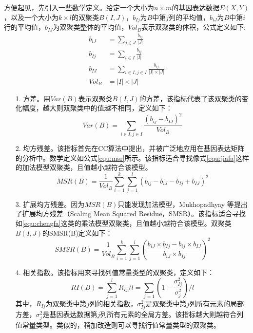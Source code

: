   方便起见，先引入一些数学定义。给定一个大小为$n\times m$的基因表达数据$E(X,Y)$，以及一个大小为$k\times l$的双聚类$B(I,J)$，$b_{Ij}$为$B$中第$j$列的平均值，$b_{iJ}$为$B$中第$i$行的平均值，$b_{IJ}$为双聚类整体的平均值，$Vol_B$表示双聚类的体积，公式定义如下:
  \begin{align}
    b_{iJ} &= \sum_{j\in J}\frac{b_{ij}}{|J|} \\
    b_{Ij} &= \sum_{i\in I}\frac{b_{ij}}{|I|} \\
    b_{IJ} &= \sum_{i\in I,j\in I}\frac{ b_{ij} }{|I| \times |J|}\\
    Vol_B &= |I| \times |J|
  \end{align}
  \begin{enumerate}
    \item[1.] 方差。用$Var(B)$表示双聚类$B(I,J)$的方差，该指标代表了该双聚类的变化幅度，越大则双聚类中的值越不相同，定义如下：
    \begin{equation}
      Var(B) = \sum_{i\in I,j\in I}\frac{(b_{ij}-b_{IJ})^2}{Vol_B}
    \end{equation}

    \item[2.] 均方残差。该指标首先在CC算法中提出，并被广泛地应用在基因表达矩阵的分析中。数学定义如公式\ref{equ:msr}所示。该指标适合寻找像式\ref{equ:jiafa}这样的加法模型双聚类，且值越小越符合该模型。
    \begin{equation}\label{equ:msr}
      MSR(B) = \frac{1}{Vol_B}\sum_{i=1}^k\sum_{j=1}^l(b_{ij}-b_{iJ}-b_{Ij}+b_{IJ})^2
    \end{equation}

    \item[3.] 扩展均方残差。因为$MSR(B)$只能发现加法模型，Mukhopadhyay 等提出了扩展均方残差（Scaling Mean Squared Residue，SMSR）。该指标适合寻找如\ref{equ:chengfa}这类的乘法模型双聚类，且值越小越符合该模型。双聚类$B(I,J)$的SMSR(B)定义如下：
    \begin{equation}\label{equ:smsr}
      SMSR(B) = \frac{1}{Vol_B}\sum_{i=1}^k\sum_{j=1}^l(\frac{b_{iJ}\times b_{Ij}-b_{ij}\times b_{IJ}}{b_{iJ}\times b_{Ij}})^2
    \end{equation}

    \item[4.] 相关指数。该指标用来寻找列值常量类型的双聚类，定义如下：
    \begin{equation}
      RI(B) = \sum_{j=1}^l R_{Ij}/l = \sum_{j=1}(1 - \frac{\sigma_{Ij}^2}{\sigma_j^2})/l
    \end{equation}
    \hspace{2em} 其中，$R_{Ij}$为双聚类中第$j$列的相关指数，$\sigma_{Ij}^2$是双聚类中第$j$列所有元素的局部方差，$\sigma_{j}^2$是基因表达数据第$j$列所有元素的全局方差。该指标越大则越符合列值常量类型。类似的，稍加改造则可以寻找行值常量类型的双聚类。


\end{enumerate}
